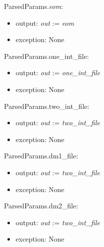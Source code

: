\documentclass[12pt, titlepage]{article}
\begin{document}
\noindent ParsedParams.\textit{eom}:
\begin{itemize}
	\item output: \textit{out} := \textit{eom} 
	\item exception: None 
\end{itemize}

\noindent ParsedParams.one\_int\_file:
\begin{itemize}
	\item output: \textit{out} := \textit{one\_int\_file} 
	\item exception: None 
\end{itemize}

\noindent ParsedParams.two\_int\_file:
\begin{itemize}
	\item output: \textit{out} := \textit{two\_int\_file} 
	\item exception: None 
\end{itemize}

\noindent ParsedParams.dm1\_file:
\begin{itemize}
	\item output: \textit{out} := \textit{two\_int\_file} 
	\item exception: None 
\end{itemize}

\noindent ParsedParams.dm2\_file:
\begin{itemize}
	\item output: \textit{out} := \textit{two\_int\_file} 
	\item exception: None 
\end{itemize}

%
\end{document}
